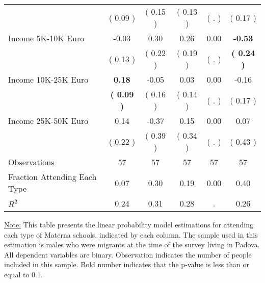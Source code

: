 \begin{table}[H]
{\begin{tabular}{lccccc}
\quad  & (     0.09 ) & (     0.15 )  & (     0.13 )  & (        . ) & (     0.17 ) \\
\quad Income 5K-10K Euro &     -0.03 &      0.30 &      0.26 &      0.00 & \textbf{    -0.53} \\
\quad  & (     0.13 ) & (     0.22 )  & (     0.19 )  & (        . ) & \textbf{(     0.24 )} \\
\quad Income 10K-25K Euro & \textbf{     0.18} &     -0.05 &      0.03 &      0.00 &     -0.16 \\
\quad  & \textbf{(     0.09 )} & (     0.16 )  & (     0.14 )  & (        . ) & (     0.17 ) \\
\quad Income 25K-50K Euro &      0.14 &     -0.37 &      0.15 &      0.00 &      0.07 \\
\quad  & (     0.22 ) & (     0.39 )  & (     0.34 )  & (        . ) & (     0.43 ) \\
\midrule
Observations & 57 & 57 & 57 & 57 & 57 \\
Fraction Attending Each Type &      0.07 &      0.30 &      0.19 &      0.00 &      0.40 \\
\midrule
$ R^2$ &      0.24 &      0.31 &      0.28 &         . &      0.26 \\
\bottomrule
\end{tabular}}
\end{table}
\begin{footnotesize}
\noindent\underline{Note:} This table presents the linear probability model estimations for attending each type of Materna schools, indicated by each column. The sample used in this estimation is males who were migrants at the time of the survey living in Padova. All dependent variables are binary. Observation indicates the number of people included in this sample. Bold number indicates that the p-value is less than or equal to 0.1.
\end{footnotesize}
